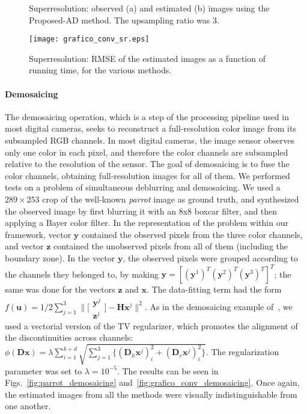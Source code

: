 \documentclass[10pt,twocolumn,twoside]{IEEEtran}
\newcommand{\Hm}{\mathbf{H}} %
\newcommand{\y}{\mathbf{y}} %
\newcommand{\x}{\mathbf{x}} %
\newcommand{\z}{\mathbf{z}} %
\newcommand{\D}{\mathbf{D}} %
\newcommand{\uu}{\mathbf{u}} %
\begin{document}
\begin{figure}[!t]
	\centering
	\hfil
	\caption{Superresolution: observed (a) and estimated (b) images using the Proposed-AD method. The upsampling ratio was 3.}
	\label{fig:pavia_sr}
\end{figure}

\begin{figure}[!t]
	\centering
	\texttt{[image: grafico\_conv\_sr.eps]}%
	\caption{Superresolution: RMSE of the estimated images as a function of running time, for the various methods.}
	\label{fig:grafico_conv_sr}
\end{figure}

\paragraph{Demosaicing}  The demosaicing operation, which is a step of the processing pipeline used in most digital cameras, seeks to reconstruct a full-resolution color image from its subsampled RGB channels. In most digital cameras, the image sensor observes only one color in each pixel, and therefore the color channels are subsampled relative to the resolution of the sensor. The goal of demosaicing is to fuse the color channels, obtaining full-resolution images for all of them. We performed tests on a problem of simultaneous deblurring and demosaicing. We used a $289 \times 253$ crop of the well-known \emph{parrot} image as ground truth, and synthesized the observed image by first blurring it with an 8x8 boxcar filter, and then applying a Bayer color filter. In the representation of the problem within our framework, vector $\y$ contained the observed pixels from the three color channels, and vector $\z$ contained the unobserved pixels from all of them (including the boundary zone). In the vector $\y$, the observed pixels were grouped according to the channels they belonged to, by making $\y = [(\y^1)^T (\y^2)^T (\y^3)^T]^T$; the same was done for the vectors $\z$ and $\x$. The data-fitting term had the form $f(\uu) = 1/2 \sum_{j=1}^3 \big\| \big[ \begin{smallmatrix} \y^j \\ \z^j \end{smallmatrix} \big] - \Hm \x^j \big\|^2$. As in the demosaicing example of~\cite{Condat2014}, we used a vectorial version of the TV regularizer, which promotes the alignment of the discontinuities across channels: $\phi(\D \x) = \lambda \sum_{i=1}^{k+d} \sqrt{\sum_{j=1}^3 \{ (\D_h \x^j)_i^2 + (\D_v \x^j)_i^2 \}}$. The regularization parameter was set to $\lambda = 10^{-5}$. The results can be seen in Figs.~\ref{fig:parrot_demosaicing} and~\ref{fig:grafico_conv_demosaicing}. Once again, the estimated images from all the methods were visually indistinguishable from one another.
\end{document}
